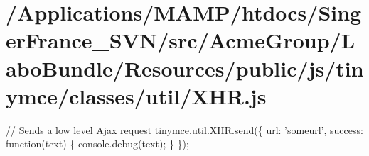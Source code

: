\hypertarget{_2_applications_2_m_a_m_p_2htdocs_2_singer_france__s_v_n_2src_2_acme_group_2_labo_bundle_2_resou91ef1cc369759dc4f7ca933d9875dc87}{\section{/\+Applications/\+M\+A\+M\+P/htdocs/\+Singer\+France\+\_\+\+S\+V\+N/src/\+Acme\+Group/\+Labo\+Bundle/\+Resources/public/js/tinymce/classes/util/\+X\+H\+R.\+js}
}
// Sends a low level Ajax request tinymce.\+util.\+X\+H\+R.\+send(\{ url\+: 'someurl', success\+: function(text) \{ console.\+debug(text); \} \});


\begin{DoxyCodeInclude}
\end{DoxyCodeInclude}
 